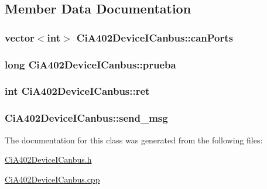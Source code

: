 \subsection{Member Data Documentation}
\subsubsection[{\texorpdfstring{can\+Ports}{canPorts}}]{\setlength{\rightskip}{0pt plus 5cm}vector$<$int$>$ Ci\+A402\+Device\+I\+Canbus\+::can\+Ports}\hypertarget{classCiA402DeviceICanbus_a456534a394e4072025f2528938d1070d}{}\label{classCiA402DeviceICanbus_a456534a394e4072025f2528938d1070d}
\subsubsection[{\texorpdfstring{prueba}{prueba}}]{\setlength{\rightskip}{0pt plus 5cm}long Ci\+A402\+Device\+I\+Canbus\+::prueba\hspace{0.3cm}{\ttfamily [private]}}\hypertarget{classCiA402DeviceICanbus_aa3ab38e7395ad35b3cc28281352b5e40}{}\label{classCiA402DeviceICanbus_aa3ab38e7395ad35b3cc28281352b5e40}
\subsubsection[{\texorpdfstring{ret}{ret}}]{\setlength{\rightskip}{0pt plus 5cm}int Ci\+A402\+Device\+I\+Canbus\+::ret}\hypertarget{classCiA402DeviceICanbus_af6cf1493b669ce0415cefed7d84e5710}{}\label{classCiA402DeviceICanbus_af6cf1493b669ce0415cefed7d84e5710}
\subsubsection[{\texorpdfstring{send\+\_\+msg}{send_msg}}]{ Ci\+A402\+Device\+I\+Canbus\+::send\+\_\+msg\hspace{0.3cm}{\ttfamily [private]}}\hypertarget{classCiA402DeviceICanbus_a47d8ee98f0f3569874a4018268ab1fb5}{}\label{classCiA402DeviceICanbus_a47d8ee98f0f3569874a4018268ab1fb5}


The documentation for this class was generated from the following files\+:\begin{DoxyCompactItemize}
\item 
\hyperlink{CiA402DeviceICanbus_8h}{Ci\+A402\+Device\+I\+Canbus.\+h}\item 
\hyperlink{CiA402DeviceICanbus_8cpp}{Ci\+A402\+Device\+I\+Canbus.\+cpp}\end{DoxyCompactItemize}
